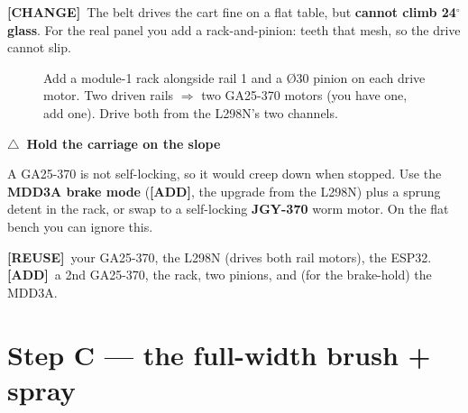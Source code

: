 \documentclass[11pt,a4paper]{article}
\newenvironment{checkbox}[1]
  {\par\medskip\noindent\begin{lrbox}{\gbbox}\begin{minipage}{0.95\linewidth}\footnotesize\textbf{#1}\par\smallskip}
  {\end{minipage}\end{lrbox}\setlength{\fboxsep}{8pt}\fcolorbox{red!60!black}{red!5}{\usebox{\gbbox}}\par\medskip}
\newcommand{\warn}{\textcolor{orange!80!black}{$\triangle$}}
\newcommand{\reuse}{\textcolor{green!50!black}{\textbf{[REUSE]}}}
\newcommand{\addp}{\textcolor{orange!85!black}{\textbf{[ADD]}}}
\newcommand{\change}{\textcolor{blue!70!black}{\textbf{[CHANGE]}}}
\begin{document}
\change\ The belt drives the cart fine on a flat table, but \textbf{cannot climb 24$^\circ$ glass}. For
the real panel you add a rack-and-pinion: teeth that mesh, so the drive cannot slip.

\begin{figure}[h]
\centering
{}
\caption{Add a module-1 rack alongside rail 1 and a \O30 pinion on each drive motor. Two driven rails
$\Rightarrow$ two GA25-370 motors (you have one, add one). Drive both from the L298N's two channels.}
\end{figure}

\begin{checkbox}{\warn\ Hold the carriage on the slope}
A GA25-370 is not self-locking, so it would creep down when stopped. Use the \textbf{MDD3A brake mode}
(\addp, the upgrade from the L298N) plus a sprung detent in the rack, or swap to a self-locking
\textbf{JGY-370} worm motor. On the flat bench you can ignore this.
\end{checkbox}

\reuse\ your GA25-370, the L298N (drives both rail motors), the ESP32. \addp\ a 2nd GA25-370, the rack,
two pinions, and (for the brake-hold) the MDD3A.

\section{Step C --- the full-width brush + spray}
\end{document}
